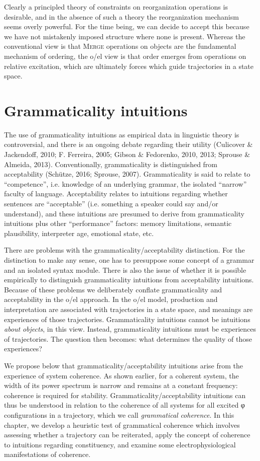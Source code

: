   Clearly a principled theory of constraints on reorganization operations is desirable, and in the absence of such a theory the reorganization mechanism seems overly powerful. For the time being, we can decide to accept this because we have not mistakenly imposed structure where none is present. Whereas the conventional view is that \textsc{Merge} operations on objects are the fundamental mechanism of ordering, the o/el view is that order emerges from operations on relative excitation, which are ultimately forces which guide trajectories in a state space.

\chapter{Grammaticality intuitions}

The use of grammaticality intuitions as empirical data in linguistic theory is controversial, and there is an ongoing debate regarding their utility (Culicover \& Jackendoff, 2010; F. Ferreira, 2005; Gibson \& Fedorenko, 2010, 2013; Sprouse \& Almeida, 2013). Conventionally, grammaticality is distinguished from acceptability (Schütze, 2016; Sprouse, 2007). Grammaticality is said to relate to “competence”, i.e. knowledge of an underlying grammar, the isolated “narrow” faculty of language. Acceptability relates to intuitions regarding whether sentences are “acceptable” (i.e. something a speaker could say and/or understand), and these intuitions are presumed to derive from grammaticality intuitions plus other “performance” factors: memory limitations, semantic plausibility, interpreter age, emotional state, etc. 

  There are problems with the grammaticality/acceptability distinction. For the distinction to make any sense, one has to presuppose some concept of a grammar and an isolated syntax module. There is also the issue of whether it is possible empirically to distinguish grammaticality intuitions from acceptability intuitions. Because of these problems we deliberately conflate grammaticality and acceptability in the o/el approach. In the o/el model, production and interpretation are associated with trajectories in a state space, and meanings are experiences of those trajectories. Grammaticality intuitions cannot be intuitions \textit{about} \textit{objects}, in this view. Instead, grammaticality intuitions must be experiences of trajectories. The question then becomes: what determines the quality of those experiences? 

  We propose below that grammaticality/acceptability intuitions arise from the experience of system coherence. As shown earlier, for a coherent system, the width of its power spectrum is narrow and remains at a constant frequency: coherence is required for stability. Grammaticality/acceptability intuitions can thus be understood in relation to the coherence of all systems for all excited φ configurations in a trajectory, which we call \textit{grammatical} \textit{coherence}. In this chapter, we develop a heuristic test of grammatical coherence which involves assessing whether a trajectory can be reiterated, apply the concept of coherence to intuitions regarding constituency, and examine some electrophysiological manifestations of coherence. 

